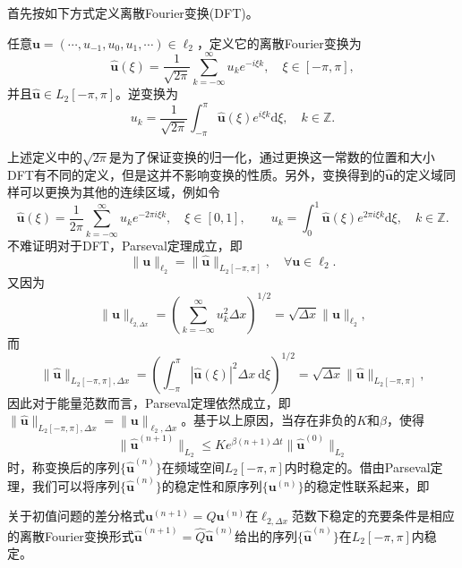 \documentclass[a4paper,10pt]{ctexart}
\begin{document}
首先按如下方式定义离散Fourier变换(DFT)。
\begin{definition}
    任意$ \bm{u} = (\cdots ,u_{-1},u_0,u_1,\cdots )\in \ell_2 $，定义它的离散Fourier变换为
    \begin{equation}
        \hat{\bm{u}}(\xi) = \frac{1}{\sqrt{2 \pi} }\sum_{k=-\infty}^\infty u_k e^{-i\xi k},\quad \xi\in [-\pi,\pi],
    \end{equation}
    并且$ \hat{\bm{u}}\in L_2[-\pi,\pi] $。逆变换为
    \begin{equation}
        u_k = \frac{1}{\sqrt{2 \pi} }\int_{-\pi}^\pi \hat{\bm{u}}(\xi) e^{i\xi k} \mathrm{d}\xi,\quad k\in \mathbb{Z}.
    \end{equation}
\end{definition}
\noindent 上述定义中的$ \sqrt{2\pi} $是为了保证变换的归一化，通过更换这一常数的位置和大小DFT有不同的定义，但是这并不影响变换的性质。另外，变换得到的$ \hat{\bm{u}} $的定义域同样可以更换为其他的连续区域，例如令
\[
    \hat{\bm{u}}(\xi) = \frac{1}{2\pi} \sum_{k=-\infty}^\infty u_k e^{-2 \pi i\xi k},\quad \xi\in [0,1],\qquad u_k = \int_0^1 \hat{\bm{u}}(\xi) e^{2\pi i\xi k} \mathrm{d}\xi,\quad k\in \mathbb{Z}.
\]
不难证明对于DFT，Parseval定理成立，即
\begin{equation}
    \| \bm{u} \|_{\ell_2} = \| \hat{\bm{u}} \|_{L_2[-\pi,\pi]},\quad \forall \bm{u}\in \ell_2.
\end{equation}
又因为
\[
    \| \bm{u} \|_{\ell_{2,\Delta x}} = \left( \sum_{k=-\infty}^\infty u_k^2 \Delta x \right)^{1 / 2} = \sqrt{\Delta x}  \| \bm{u} \|_{\ell_2},
\]
而
\[
    \| \hat{\bm{u}} \|_{L_2[-\pi,\pi],\Delta x} = \left( \int_{-\pi}^\pi |\hat{\bm{u}}(\xi)|^2 \Delta x\ \mathrm{d}\xi \right)^{1 / 2} = \sqrt{\Delta x}  \| \hat{\bm{u}} \|_{L_2[-\pi,\pi]},
\]
因此对于能量范数而言，Parseval定理依然成立，即$ \| \hat{\bm{u}} \|_{L_2[-\pi,\pi],\Delta x} = \| \bm{u} \|_{\ell_2,\Delta x} $。基于以上原因，当存在非负的$ K $和$ \beta $，使得
\begin{equation}
    \| \hat{\bm{u}}^{(n+1)} \|_{L_2} \leqslant K e^{\beta (n+1)\Delta t} \| \hat{\bm{u}}^{(0)} \|_{L_2}
\end{equation}
时，称变换后的序列$ \{\hat{\bm{u}}^{(n)}\} $在频域空间$ L_2[-\pi,\pi] $内时稳定的。借由Parseval定理，我们可以将序列$ \{\hat{\bm{u}}^{(n)}\} $的稳定性和原序列$ \{\bm{u}^{(n)}\} $的稳定性联系起来，即
\begin{proposition}
    关于初值问题的差分格式$ \bm{u}^{(n+1)} = Q \bm{u}^{(n)} $在$ \ell_{2,\Delta x} $范数下稳定的充要条件是相应的离散Fourier变换形式$ \hat{\bm{u}}^{(n+1)} = \hat{Q} \hat{\bm{u}}^{(n)} $给出的序列$ \{\hat{\bm{u}}^{(n)}\} $在$ L_2[-\pi,\pi] $内稳定。
\end{proposition}
\end{document}
